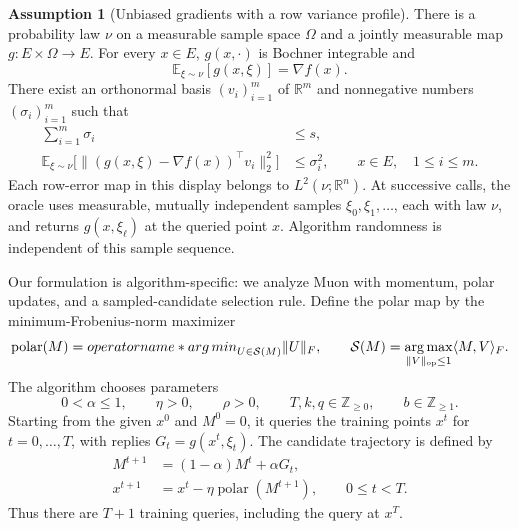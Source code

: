 \documentclass[10pt]{article}
\theoremstyle{definition}
\newtheorem{assumption}{Assumption}
\begin{document}
\begin{assumption}[Unbiased gradients with a row variance profile]
There is a probability law $\nu$ on a measurable sample space $\Omega$ and a jointly measurable map $g:E\times\Omega\to E$. For every $x\in E$, $g(x,\cdot)$ is Bochner integrable and
\[
\mathbb{E}_{\xi\sim\nu}[g(x,\xi)]=\nabla f(x).
\]
There exist an orthonormal basis $(v_i)_{i=1}^m$ of $\mathbb{R}^m$ and nonnegative numbers $(\sigma_i)_{i=1}^m$ such that
\[
\begin{aligned}
\sum_{i=1}^m\sigma_i&\leq s,\\
\mathbb{E}_{\xi\sim\nu}
\bigl[\|(g(x,\xi)-\nabla f(x))^\top v_i\|_2^2\bigr]
&\leq\sigma_i^2,
\qquad x\in E,\quad 1\leq i\leq m.
\end{aligned}
\]
Each row-error map in this display belongs to $L^2(\nu;\mathbb{R}^n)$. At successive calls, the oracle uses measurable, mutually independent samples $\xi_0,\xi_1,\ldots$, each with law $\nu$, and returns $g(x,\xi_\ell)$ at the queried point $x$. Algorithm randomness is independent of this sample sequence.
\end{assumption}

Our formulation is algorithm-specific: we analyze Muon with momentum, polar updates, and a sampled-candidate selection rule. Define the polar map by the minimum-Frobenius-norm maximizer
\[
\operatorname{polar}(M)
=\\operatorname*{arg\,min}_{U\in\mathcal{S}(M)}\|U\|_F,
\qquad
\mathcal{S}(M)
=\operatorname*{arg\,max}_{\|V\|_{\mathrm{op}}\leq1}
\langle M,V\rangle_F.
\]
The algorithm chooses parameters
\[
0<\alpha\leq1,\qquad \eta>0,\qquad \rho>0,
\qquad T,k,q\in\mathbb{Z}_{\geq0},\qquad b\in\mathbb{Z}_{\geq1}.
\]
Starting from the given $x^0$ and $M^0=0$, it queries the training points $x^t$ for $t=0,\ldots,T$, with replies $G_t=g(x^t,\xi_t)$. The candidate trajectory is defined by
\[
\begin{aligned}
M^{t+1}&=(1-\alpha)M^t+\alpha G_t,\\
x^{t+1}&=x^t-\eta\operatorname{polar}(M^{t+1}),
\qquad 0\leq t<T.
\end{aligned}
\]
Thus there are $T+1$ training queries, including the query at $x^T$.
\end{document}
